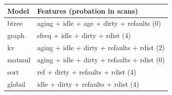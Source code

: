 \begin{tabular}{@{}ll@{}}
\toprule
\textbf{Model} & \textbf{Features (probation in scans)} \\
\midrule
btree & aging + idle + age + dirty + refaults (0) \\
graph & sfreq + idle + dirty + rdist (4) \\
kv & aging + idle + dirty + refaults + rdist (2) \\
matmul & aging + idle + dirty + refaults + rdist (0) \\
sort & ref + dirty + refaults + rdist (4) \\
global & idle + dirty + refaults + rdist (4) \\
\bottomrule
\end{tabular}
